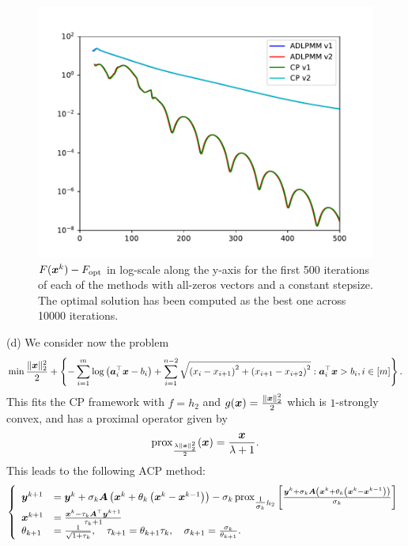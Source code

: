 \begin{figure}[H]
\centering
\includegraphics[width=14cm]{images/part3_ex2_fig1.pdf}
\caption{$F(\boldsymbol x^k)-F_{\text{opt}}$ in log-scale along the 
y-axis for the first 500 iterations of each of the methods 
with all-zeros vectors and a constant stepsize. The optimal solution has been computed as the best one across 10000 iterations. }
\label{fig:ex4}
\end{figure}
%
\indent (d) We consider now the problem
\begin{align*}
	\min \frac{\|\boldsymbol x \|^2_2}{2} + 
  \left\{-\sum_{i=1}^m\log\left(\boldsymbol a_i^\top \boldsymbol x - 
  b_i\right)+ \sum_{i=1}^{n-2} 
  \sqrt{\left(x_i-x_{i+1}\right)^2+\left(x_{i+1}-x_{i+2} 
  \right)^2}: \boldsymbol a_i^\top \boldsymbol x > b_i, i\in [m] \right\}. 
\end{align*}
This fits the CP framework with $f = h_2$ and $g(\boldsymbol x)=\frac{\|\boldsymbol x \|^2_2}{2}$ which is $1$-strongly convex, and has a proximal operator given by
\begin{align*}
	\operatorname{prox}_{\frac{\lambda\|\boldsymbol x \|^2_2}{2}}(\boldsymbol x) = \frac{\boldsymbol x}{\lambda+1}. 
\end{align*}
This leads to the following ACP method: 
  \begin{align*}
    \begin{split}
    \left\{
    \begin{array}{ll}
       \boldsymbol y^{k+1} &= \boldsymbol y^k + \sigma_k \boldsymbol A\left(\boldsymbol x^k + 
       \theta_k \left( \boldsymbol x^{k}-\boldsymbol x^{k-1}\right)\right)- 
       \sigma_k \operatorname{prox}_{{\textstyle\frac{1}{\sigma_k}} h_2}\left[\frac{\boldsymbol y^k + \sigma_k \boldsymbol A\left(\boldsymbol x^k + \theta_k \left( \boldsymbol x^{k}-\boldsymbol x^{k-1}\right)\right)}{\sigma_k} \right]\\
       \boldsymbol x^{k+1} &= \frac{\boldsymbol x^k - \tau_k\boldsymbol A^\top \boldsymbol y^{k+1}}{\tau_k+1}\\
       \theta_{k+1} &= \frac{1}{\sqrt{1+\tau_k}},\quad \tau_{k+1} = \theta_{k+1}\tau_k,\quad \sigma_{k+1} = \frac{\sigma_k}{\theta_{k+1}}.
    \end{array}
    \right.
    \end{split}
    \end{align*}
    
